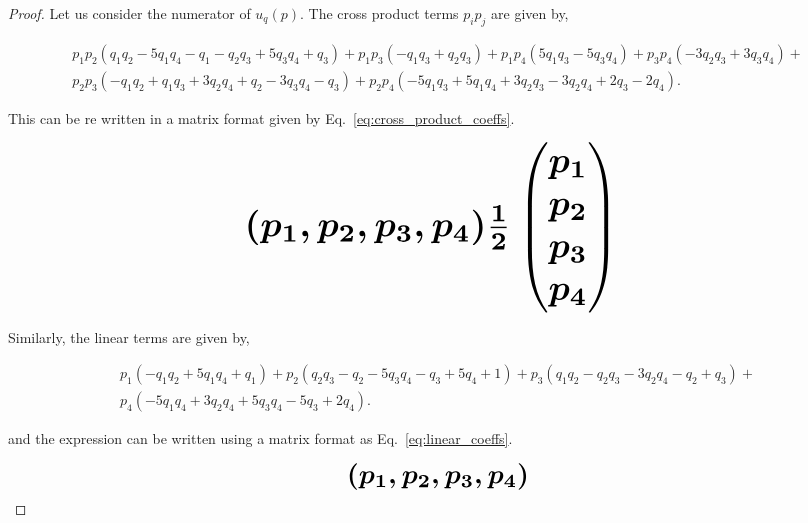 \documentclass[10pt]{article}
\begin{document}
\begin{proof}
    Let us consider the numerator of \(u_q(p)\). The cross product terms \(p_ip_j\)
    are given by,
    
    \begingroup
    \footnotesize
    \begin{align*}
    p_{1} p_{2} (q_{1} q_{2} - 5 q_{1} q_{4} - q_{1} - q_{2} q_{3} + 5 q_{3} q_{4}
    + q_{3}) + p_{1} p_{3} (- q_{1} q_{3} + q_{2} q_{3}) + p_{1} p_{4} (5 q_{1} q_{3} -
    5 q_{3} q_{4}) + p_{3} p_{4} (- 3 q_{2} q_{3} + 3 q_{3} q_{4}) +  \\
    p_{2} p_{3} (- q_{1} q_{2} + q_{1} q_{3} + 3 q_{2} q_{4} + q_{2} - 3 q_{3} q_{4} - q_{3}) +
    p_{2} p_{4} (- 5 q_{1} q_{3} + 5 q_{1} q_{4} + 3 q_{2} q_{3} - 3 q_{2} q_{4} +
    2 q_{3} - 2 q_{4}).
    \end{align*}
    \endgroup
    
    This can be re written in a matrix format given by Eq.~\ref{eq:cross_product_coeffs}.
    
    \begin{equation}\label{eq:cross_product_coeffs}
        \resizebox{0.8\linewidth}{!}{\arraycolsep=2.5pt%
        \boldmath\( 
        (p_1, p_2, p_3, p_4) \frac{1}{2}  \begin{pmatrix} 
        p_1 \\
        p_2 \\
        p_3 \\
        p_4 \end{pmatrix}
        \) }
    \end{equation}
    
    Similarly, the linear terms are given by,
    
    \begingroup
    \footnotesize
    \begin{align*}
    p_{1} (- q_{1} q_{2} + 5 q_{1} q_{4} + q_{1}) + p_{2} (q_{2} q_{3} - q_{2} - 5 q_{3} q_{4} - q_{3} + 5 q_{4} + 1) + p_{3} (q_{1} q_{2} - q_{2} q_{3} - 3 q_{2} q_{4} - q_{2} + q_{3}) + \\
    p_{4} (- 5 q_{1} q_{4} + 3 q_{2} q_{4} + 5 q_{3} q_{4} - 5 q_{3} + 2 q_{4}).
    \end{align*}
    \endgroup
    
    and the expression can be written using a matrix format as Eq.~\ref{eq:linear_coeffs}.
    
    \begin{equation}\label{eq:linear_coeffs}
        \resizebox{0.38\linewidth}{!}{\arraycolsep=2.5pt%
        \boldmath\(
        (p_1, p_2, p_3, p_4) \)}
    \end{equation}
    

\end{proof}
\end{document}
